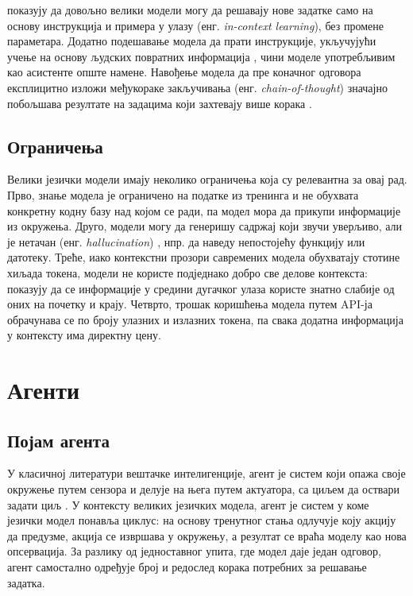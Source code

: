 \documentclass[12pt,a4paper]{report}
\begin{document}
	\textcite{brown2020gpt3} показују да довољно велики модели могу да решавају
	нове задатке само на основу инструкција и примера у улазу (енг.
	\textit{in-context learning}), без промене параметара. Додатно подешавање
	модела да прати инструкције, укључујући учење на основу људских повратних
	информација \parencite{ouyang2022instructgpt}, чини моделе употребљивим као
	асистенте опште намене. Навођење модела да пре коначног одговора експлицитно
	изложи међукораке закључивања (енг. \textit{chain-of-thought})
	значајно побољшава резултате на задацима који захтевају више корака
	\parencite{wei2022cot}.

	\subsection{Ограничења}

	Велики језички модели имају неколико ограничења која су релевантна за овај
	рад. Прво, знање модела је ограничено на податке из тренинга и не обухвата
	конкретну кодну базу над којом се ради, па модел мора да прикупи информације
	из окружења. Друго, модели могу да генеришу садржај који звучи уверљиво, али
	је нетачан (енг. \textit{hallucination}) \parencite{ji2023hallucination},
	нпр. да наведу непостојећу функцију или датотеку. Треће, иако контекстни
	прозори савремених модела обухватају стотине хиљада токена, модели не
	користе подједнако добро све делове контекста:
	\textcite{liu2024lostinthemiddle} показују да се информације у средини
	дугачког улаза користе знатно слабије од оних на почетку и крају. Четврто,
	трошак коришћења модела путем API-ја обрачунава се по броју улазних и
	излазних токена, па свака додатна информација у контексту има директну цену.

	\section{Агенти}

	\subsection{Појам агента}

	У класичној литератури вештачке интелигенције, агент је систем који
	опажа своје окружење путем сензора и делује на њега путем актуатора, са
	циљем да оствари задати циљ \parencite{russell2020aima}. У контексту
	великих језичких модела, агент је систем у коме језички модел понавља
	циклус: на основу тренутног стања одлучује коју акцију да предузме, акција
	се извршава у окружењу, а резултат се враћа моделу као нова опсервација.
	За разлику од једноставног упита, где модел даје један одговор, агент
	самостално одређује број и редослед корака потребних за решавање задатка.
\end{document}
